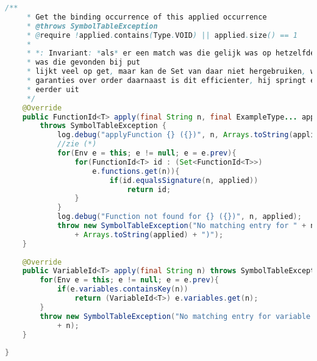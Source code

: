 \begin{lstlisting}[language=Java]
	/**
	 * Get the binding occurrence of this applied occurrence
	 * @throws SymbolTableException 
	 * @require !applied.contains(Type.VOID) || applied.size() == 1
	 * 
	 * *: Invariant: *als* er een match was die gelijk was op hetzelfde niveau, 
     * was die gevonden bij put
	 * lijkt veel op get, maar kan de Set van daar niet hergebruiken, want geen 
     * garanties over order daarnaast is dit efficienter, hij springt er 
     * eerder uit
	 */
	@Override
	public FunctionId<T> apply(final String n, final ExampleType... applied) 
        throws SymbolTableException {
		    log.debug("applyFunction {} ({})", n, Arrays.toString(applied));
		    //zie (*)
		    for(Env e = this; e != null; e = e.prev){
			    for(FunctionId<T> id : (Set<FunctionId<T>>)
                    e.functions.get(n)){
			    	    if(id.equalsSignature(n, applied))
			    		    return id;
			    }
		    }
		    log.debug("Function not found for {} ({})", n, applied);
		    throw new SymbolTableException("No matching entry for " + n + " ("  
                + Arrays.toString(applied) + ")");
	}
	
	@Override
	public VariableId<T> apply(final String n) throws SymbolTableException {
		for(Env e = this; e != null; e = e.prev){
			if(e.variables.containsKey(n))
				return (VariableId<T>) e.variables.get(n);
		}
		throw new SymbolTableException("No matching entry for variable name "
            + n);
	}
	
}
\end{lstlisting}
